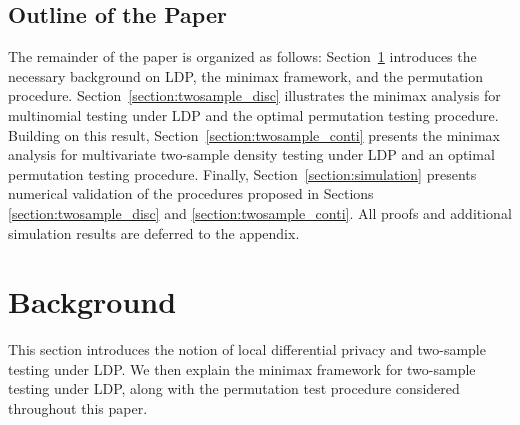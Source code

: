 \documentclass[twoside,11pt]{article}
\begin{document}
\subsection{Outline of the Paper}
The remainder of the paper is organized as follows:
Section~\ref{section:background} introduces the necessary background on LDP, the minimax framework, and the permutation procedure.
Section~\ref{section:twosample_disc} illustrates the minimax analysis for multinomial testing under LDP and the optimal permutation testing procedure.
Building on this result, Section~\ref{section:twosample_conti} presents the minimax analysis for multivariate two-sample density testing under LDP and an optimal permutation testing procedure.
Finally, Section~\ref{section:simulation} presents numerical validation of the procedures proposed in Sections \ref{section:twosample_disc} and \ref{section:twosample_conti}. All proofs and additional simulation results are deferred to the appendix.
%
\section{Background}\label{section:background}
This section introduces the notion of local differential privacy and two-sample testing under LDP. We then explain the minimax framework for two-sample testing under LDP, along with the permutation test procedure considered throughout this paper. 
%
\end{document}

